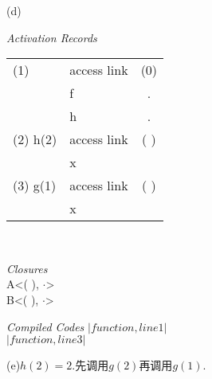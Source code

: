 \documentclass[4paper,10pt]{paper}
\begin{document}
(d)\\
\begin{minipage}{.45\textwidth}
\centering
\textit{Activation Records}
\begin{tabular}{l|l|c}
\hline
 (1) 	& access link 	& (0) 	\\ \cline{2-3}
     	& f 				& .		\\  	 \cline{2-3}
    		& h 				& .		\\
\hline
(2) h(2) 	& access link 	& ( ) \\ \cline{2-3}
   			& x				& 	 \\
\hline
(3) 	g(1) 	& access link 	& ( )		\\ \cline{2-3}
 			& x				&		\\
\hline

\end{tabular}
\end{minipage}
\makeatletter\
\begin{minipage}{.3\textwidth}
\centering
\textit{Closures}\\
A<( ), $\cdot$>\\
B<( ), $\cdot$>
\end{minipage}  
\makeatletter
\begin{minipage}{.2\textwidth}
\centering
\textit{Compiled Codes}
$|function, line 1|$\\
$|function, line 3|$
\end{minipage}


(e)$h(2)=2$.先调用$g(2)$再调用$g(1)$.
\end{document}
